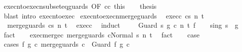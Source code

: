 \begin{isabellebody}
\ execn{\isacharunderscore}to{\isacharunderscore}execn{\isacharunderscore}subseteq{\isacharunderscore}guards\ {\isacharbrackleft}OF\ c{\isacharunderscore}c{\isacharprime}\ this{\isacharbrackright}\isanewline
\ \ \isamarkupfalse%
\ {\isacharquery}thesis\isanewline
\ \ \ \ \isamarkupfalse%
\ {\isacharparenleft}blast\ intro{\isacharcolon}\ execn{\isacharunderscore}to{\isacharunderscore}exec{\isacharparenright}\isanewline
{}\isamarkupfalse%
%
\endisatagproof
{\isafoldproof}%
%
\isadelimproof
%
\endisadelimproof
%
\isamarkuptrue%
\isamarkupfalse%
\ execn{\isacharunderscore}to{\isacharunderscore}execn{\isacharunderscore}merge{\isacharunderscore}guards{\isacharcolon}\isanewline
\ \ exec{\isacharunderscore}c{\isacharcolon}\ {\isachardoublequoteopen}{\isasymGamma}{\isasymturnstile}{\isasymlangle}c{\isacharcomma}s{\isasymrangle}\ {\isacharequal}n{\isasymRightarrow}\ t{\isachardoublequoteclose}\ \isanewline
\ \ {\isachardoublequoteopen}{\isasymGamma}{\isasymturnstile}{\isasymlangle}merge{\isacharunderscore}guards\ c{\isacharcomma}s{\isasymrangle}\ {\isacharequal}n{\isasymRightarrow}\ t\ {\isachardoublequoteclose}\isanewline
%
\isadelimproof
%
\endisadelimproof
%
\isatagproof
{}\isamarkupfalse%
\ exec{\isacharunderscore}c\ \isanewline
{}\isamarkupfalse%
\ {\isacharparenleft}induct{\isacharparenright}\ \isanewline
\ \ \isamarkupfalse%
\ {\isacharparenleft}Guard\ s\ g\ c\ n\ t\ f{\isacharparenright}\isanewline
\ \ \isamarkupfalse%
\ s{\isacharunderscore}in{\isacharunderscore}g{\isacharcolon}\ {\isachardoublequoteopen}s\ {\isasymin}\ g{\isachardoublequoteclose}\ \ \isamarkupfalse%
\ fact\isanewline
\ \ \isamarkupfalse%
\ exec{\isacharunderscore}merge{\isacharunderscore}c{\isacharcolon}\ {\isachardoublequoteopen}{\isasymGamma}{\isasymturnstile}{\isasymlangle}merge{\isacharunderscore}guards\ c{\isacharcomma}Normal\ s{\isasymrangle}\ {\isacharequal}n{\isasymRightarrow}\ t{\isachardoublequoteclose}\ \isamarkupfalse%
\ fact\isanewline
\ \ \isamarkupfalse%
\ {\isacharquery}case\isanewline
\ \ \isamarkupfalse%
\ {\isacharparenleft}cases\ {\isachardoublequoteopen}{\isasymexists}f{\isacharprime}\ g{\isacharprime}\ c{\isacharprime}{\isachardot}\ merge{\isacharunderscore}guards\ c\ {\isacharequal}\ Guard\ f{\isacharprime}\ g{\isacharprime}\ c{\isacharprime}{\isachardoublequoteclose}{\isacharparenright}\isanewline

\end{isabellebody}

